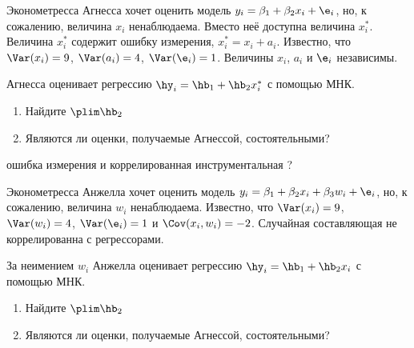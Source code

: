\documentclass[pdftex,11pt,openany]{book}\usepackage[]{graphicx}\usepackage[]{color}
\begin{document}
\begin{solution}
\end{solution}


\begin{problem}
Эконометресса Агнесса хочет оценить модель $y_i=\beta_1+\beta_2 x_i +\e_i$, но, к сожалению, величина $x_i$ ненаблюдаема. Вместо неё доступна величина  $x_i^*$. Величина $x_i^*$  содержит ошибку измерения, $x_i^*=x_i+a_i$. Известно, что $\Var(x_i)=9$, $\Var(a_i)=4$,   $\Var(\e_i)=1$. Величины $x_i$, $a_i$ и $\e_i$ независимы.

Агнесса оценивает регрессию $\hy_i=\hb_1+\hb_2 x_i^*$ с помощью МНК. 
\begin{enumerate}
\item Найдите $\plim \hb_2$
\item Являются ли оценки, получаемые Агнессой, состоятельными?
\end{enumerate}
\end{problem}

\begin{solution}
\end{solution}


\begin{problem}
ошибка измерения и коррелированная инструментальная ?
\end{problem}

\begin{solution}
\end{solution}


\begin{problem}
Эконометресса Анжелла хочет оценить модель $y_i=\beta_1+\beta_2 x_i +\beta_3 w_i +\e_i$, но, к сожалению, величина $w_i$ ненаблюдаема. Известно, что $\Var(x_i)=9$, $\Var(w_i)=4$,  $\Var(\e_i)=1$ и $\Cov(x_i,w_i)=-2$. Случайная составляющая не коррелированна с регрессорами. 

За неимением $w_i$ Анжелла оценивает регрессию $\hy_i=\hb_1+\hb_2 x_i$ с помощью МНК. 
\begin{enumerate}
\item Найдите $\plim \hb_2$
\item Являются ли оценки, получаемые Агнессой, состоятельными?
\end{enumerate}

\end{problem}

\begin{solution}
\end{solution}
\end{document}
